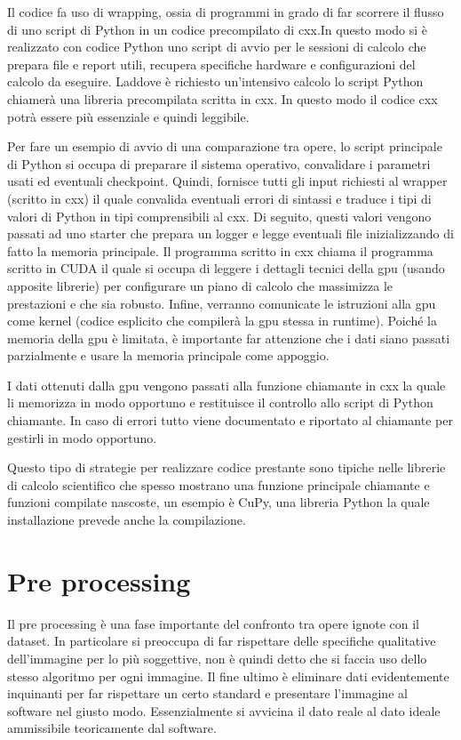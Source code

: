 \begin{toDo}
	\bigskip\noindent Il codice fa uso di wrapping, ossia di programmi in grado di far scorrere il flusso di uno script di \gls{Python} in un codice precompilato di \gls{cxx}.In questo modo si è realizzato con codice \gls{Python} uno script di avvio per le sessioni di calcolo che prepara file e report utili, recupera specifiche hardware e configurazioni del calcolo da eseguire. Laddove è richiesto un'intensivo calcolo lo script \gls{Python} chiamerà una libreria precompilata scritta in \gls{cxx}. In questo modo il codice \gls{cxx} potrà essere più essenziale e quindi leggibile.

	\noindent Per fare un esempio di avvio di una comparazione tra opere, lo script principale di \gls{Python} si occupa di preparare il sistema operativo, convalidare i parametri usati ed eventuali checkpoint. Quindi, fornisce tutti gli input richiesti al wrapper (scritto in \gls{cxx}) il quale convalida eventuali errori di sintassi e traduce i tipi di valori di \gls{Python} in tipi comprensibili al \gls{cxx}. Di seguito, questi valori vengono passati ad uno starter che prepara un logger e legge eventuali file inizializzando di fatto la memoria principale. Il programma scritto in \gls{cxx} chiama il programma scritto in \gls{CUDA} il quale si occupa di leggere i dettagli tecnici della \gls{gpu} (usando apposite librerie) per configurare un piano di calcolo che massimizza le prestazioni e che sia robusto. Infine, verranno comunicate le istruzioni alla \gls{gpu} come kernel (codice esplicito che compilerà la \gls{gpu} stessa in runtime). Poiché la memoria della \gls{gpu} è limitata, è importante far attenzione che i dati siano passati parzialmente e usare la memoria principale come appoggio.

	\noindent I dati ottenuti dalla \gls{gpu} vengono passati alla funzione chiamante in \gls{cxx} la quale li memorizza in modo opportuno e restituisce il controllo allo script di \gls{Python} chiamante. In caso di errori tutto viene documentato e riportato al chiamante per gestirli in modo opportuno.

	\noindent Questo tipo di strategie per realizzare codice prestante sono tipiche nelle librerie di calcolo scientifico che spesso mostrano una funzione principale chiamante e funzioni compilate nascoste, un esempio è CuPy, una libreria \gls{Python} la quale installazione prevede anche la compilazione.

    \section{Pre processing}
    Il pre processing è una fase importante del confronto tra opere ignote con il dataset. In particolare si preoccupa di far rispettare delle specifiche qualitative dell'immagine per lo più soggettive, non è quindi detto che si faccia uso dello stesso algoritmo per ogni immagine. Il fine ultimo è eliminare dati evidentemente inquinanti per far rispettare un certo standard e presentare l'immagine al software nel giusto modo. Essenzialmente si avvicina il dato reale al dato ideale ammissibile teoricamente dal software.


\end{toDo}
